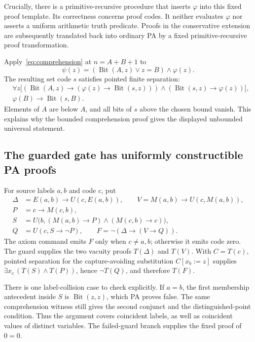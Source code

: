 Crucially, there is a primitive-recursive procedure that inserts \(\varphi\) into this fixed proof template. Its correctness concerns proof codes. It neither evaluates \(\varphi\) nor asserts a uniform arithmetic truth predicate. Proofs in the conservative extension are subsequently translated back into ordinary PA by a fixed primitive-recursive proof transformation.

Apply~\eqref{eq:comprehension} at \(n=A+B+1\) to
\[
 \psi(z)=(\operatorname{Bit}(A,z)\vee z=B)\wedge\varphi(z).
\]
The resulting set code \(s\) satisfies pointed finite separation:
\begin{align*}
 &\forall z\bigl[(\operatorname{Bit}(A,z)\to
       (\varphi(z)\to\operatorname{Bit}(s,z)))
       \wedge(\operatorname{Bit}(s,z)\to\varphi(z))\bigr],\\
 &\varphi(B)\to\operatorname{Bit}(s,B).
\end{align*}
Elements of \(A\) are below \(A\), and all bits of \(s\) above the chosen bound vanish. This explains why the bounded comprehension proof gives the displayed unbounded universal statement.

\subsection{The guarded gate has uniformly constructible PA proofs}
For source labels \(a,b\) and code \(c\), put
\begin{align*}
 \Delta&=E(a,b)\to U(c,E(a,b)),\qquad
 V=M(a,b)\to U(c,M(a,b)),\\
 P&=c\to M(c,b),\\
 S&=U\bigl(b,(M(a,b)\to P)\wedge(M(c,b)\to c)\bigr),\\
 Q&=U(c,S\to\neg P),\qquad F=\neg(\Delta\to(V\to Q)).
\end{align*}
The axiom command emits \(F\) only when \(c\ne a,b\); otherwise it emits code zero. The guard supplies the two vacuity proofs \(T(\Delta)\) and \(T(V)\). With \(C=T(c)\), pointed separation for the capture-avoiding substitution \(C[x_b:=z]\) supplies
\(\exists x_c\,(T(S)\wedge T(P))\), hence \(\neg T(Q)\), and therefore \(T(F)\).

There is one label-collision case to check explicitly. If \(a=b\), the first membership antecedent inside \(S\) is \(\operatorname{Bit}(z,z)\), which PA proves false. The same comprehension witness still gives the second conjunct and the distinguished-point condition. Thus the argument covers coincident labels, as well as coincident values of distinct variables. The failed-guard branch supplies the fixed proof of \(0=0\).

